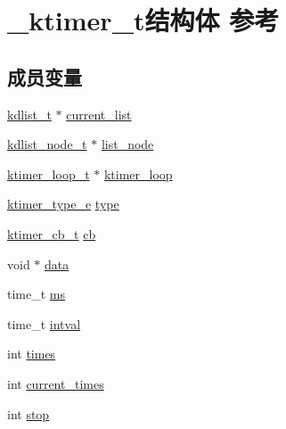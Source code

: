 \hypertarget{a00026}{}\section{\+\_\+ktimer\+\_\+t结构体 参考}
\label{a00026}
\subsection*{成员变量}
\begin{DoxyCompactItemize}
\item 
\hyperlink{a00054_ae098586334a621a23cef7cb17590b618_ae098586334a621a23cef7cb17590b618}{kdlist\+\_\+t} $\ast$ \hyperlink{a00026_a0360c63ae4a93f6cd96c527fdc4992dd_a0360c63ae4a93f6cd96c527fdc4992dd}{current\+\_\+list}
\item 
\hyperlink{a00054_ac701f00a0851c97467ae35c382b316b7_ac701f00a0851c97467ae35c382b316b7}{kdlist\+\_\+node\+\_\+t} $\ast$ \hyperlink{a00026_aa9cab0cc62a4cbeabc92fd6ddbb7ec5f_aa9cab0cc62a4cbeabc92fd6ddbb7ec5f}{list\+\_\+node}
\item 
\hyperlink{a00054_a024af2aa29615e7a811ea6c45438157d_a024af2aa29615e7a811ea6c45438157d}{ktimer\+\_\+loop\+\_\+t} $\ast$ \hyperlink{a00026_aa990d5bd4a8b8079988b9db4c1cc11f5_aa990d5bd4a8b8079988b9db4c1cc11f5}{ktimer\+\_\+loop}
\item 
\hyperlink{a00054_a42e924130e6eb3bd995344f6d3f3e918_a42e924130e6eb3bd995344f6d3f3e918}{ktimer\+\_\+type\+\_\+e} \hyperlink{a00026_a7423b634636770ecb2f6edfbc6bdc73d_a7423b634636770ecb2f6edfbc6bdc73d}{type}
\item 
\hyperlink{a00054_a2333fd0f2c3a85faf586300ca40deed4_a2333fd0f2c3a85faf586300ca40deed4}{ktimer\+\_\+cb\+\_\+t} \hyperlink{a00026_ab819f6a6f6ada412a7f48eacf2bbe329_ab819f6a6f6ada412a7f48eacf2bbe329}{cb}
\item 
void $\ast$ \hyperlink{a00026_a06e03c86d2720dac84bef631e6a8e47a_a06e03c86d2720dac84bef631e6a8e47a}{data}
\item 
time\+\_\+t \hyperlink{a00026_a1a12892ba226e41cc852fd118b7fd08b_a1a12892ba226e41cc852fd118b7fd08b}{ms}
\item 
time\+\_\+t \hyperlink{a00026_a36cb3a8cf9533869881fbcecc06554f9_a36cb3a8cf9533869881fbcecc06554f9}{intval}
\item 
int \hyperlink{a00026_a6b65efd78ea3c5e6cee2c0992cd0cead_a6b65efd78ea3c5e6cee2c0992cd0cead}{times}
\item 
int \hyperlink{a00026_abad8750e54845862d2768b348997db69_abad8750e54845862d2768b348997db69}{current\+\_\+times}
\item 
int \hyperlink{a00026_afbde3157e6d8d730adcfd5463ed7b131_afbde3157e6d8d730adcfd5463ed7b131}{stop}
\end{DoxyCompactItemize}


